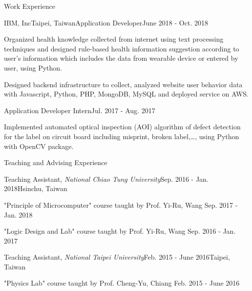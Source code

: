 \documentclass{resume} %
\begin{document}

\begin{rSection}{Work Experience}
    \begin{rSubsection}{IBM, Inc}{Taipei, Taiwan}{Application Developer}{June 2018 - Oct. 2018}
        \item Organized health knowledge collected from internet using text processing techniques
        and designed rule-based health information suggestion according to user's information which includes the data from wearable device or entered by user, using Python.
        \item Designed backend infrastructure to collect, analyzed website user behavior data with Javascript, Python, PHP, MongoDB, MySQL and deployed service on AWS.
    \end{rSubsection}
    \begin{rSubsection2}{Application Developer Intern}{Jul. 2017 - Aug. 2017}
        \item Implemented automated optical inspection (AOI) algorithm of defect detection for the label on circuit board 
        including misprint, broken label,\dots, using Python with OpenCV package.
    \end{rSubsection2}
\end{rSection}

\begin{rSection}{Teaching and Advising Experience}
    \begin{rSubsection}{Teaching Assistant, \it{National Chiao Tung University}}{Sep. 2016 - Jan. 2018}{}{Hsinchu, Taiwan}
        \item "Principle of Microcomputer" course taught by Prof. Yi-Ru, Wang \hfill Sep. 2017 - Jan. 2018
        \item "Logic Design and Lab" course taught by Prof. Yi-Ru, Wang \hfill Sep. 2016 - Jan. 2017
    \end{rSubsection}
    \begin{rSubsection}{Teaching Assistant, \it{National Taipei University}}{Feb. 2015 - June 2016}{}{Taipei, Taiwan}
        \item "Physics Lab" course taught by Prof. Cheng-Yu, Chiang \hfill Feb. 2015 - June 2016
    \end{rSubsection}
\end{rSection}
\end{document}
